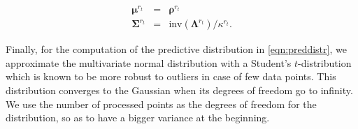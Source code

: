 \begin{eqnarray}
\label{eqn:ssmvn}
\boldsymbol{\mu}^{r_{t}}&=&\boldsymbol{\rho}^{r_{t}}\nonumber\\
\boldsymbol{\Sigma}^{r_{t}}&=&\text{inv}(\boldsymbol{\Lambda}^{r_{t}})/\kappa^{r_{t}}.
\end{eqnarray}

Finally, for the computation of the predictive distribution in
\eqref{eqn:preddistr}, we approximate the multivariate normal distribution with
a Student's $t$-distribution which is known to be more robust to outliers in
case of few data points. This distribution converges to the Gaussian when its
degrees of freedom go to infinity. We use the number of processed points as the
degrees of freedom for the distribution, so as to have a bigger variance at the
beginning.

